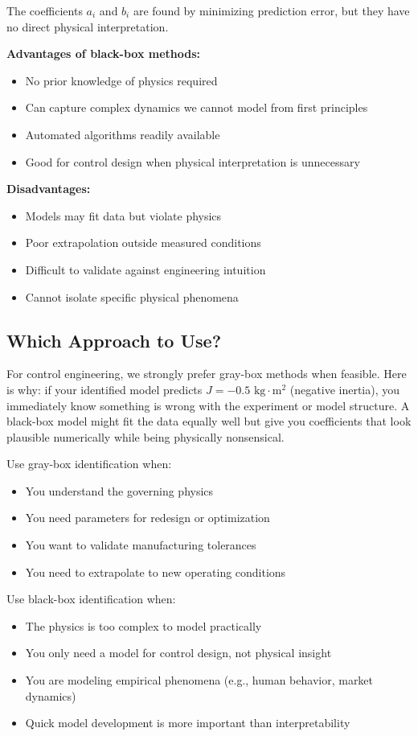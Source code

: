 The coefficients $a_i$ and $b_i$ are found by minimizing prediction error, but they have no direct physical interpretation.

\textbf{Advantages of black-box methods:}
\begin{itemize}
    \item No prior knowledge of physics required
    \item Can capture complex dynamics we cannot model from first principles
    \item Automated algorithms readily available
    \item Good for control design when physical interpretation is unnecessary
\end{itemize}

\textbf{Disadvantages:}
\begin{itemize}
    \item Models may fit data but violate physics
    \item Poor extrapolation outside measured conditions
    \item Difficult to validate against engineering intuition
    \item Cannot isolate specific physical phenomena
\end{itemize}

\subsection{Which Approach to Use?}

For control engineering, we strongly prefer gray-box methods when feasible. Here is why: if your identified model predicts $J = -0.5 \text{ kg}\cdot\text{m}^2$ (negative inertia), you immediately know something is wrong with the experiment or model structure. A black-box model might fit the data equally well but give you coefficients that look plausible numerically while being physically nonsensical.

Use gray-box identification when:
\begin{itemize}
    \item You understand the governing physics
    \item You need parameters for redesign or optimization
    \item You want to validate manufacturing tolerances
    \item You need to extrapolate to new operating conditions
\end{itemize}

Use black-box identification when:
\begin{itemize}
    \item The physics is too complex to model practically
    \item You only need a model for control design, not physical insight
    \item You are modeling empirical phenomena (e.g., human behavior, market dynamics)
    \item Quick model development is more important than interpretability
\end{itemize}


